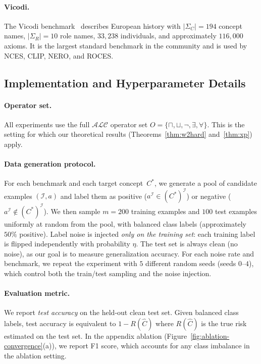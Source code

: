 \documentclass[accepted]{uai2026} %
\theoremstyle{definition}
\theoremstyle{remark}
\begin{document}
\paragraph{Vicodi.}
The Vicodi benchmark~\citep{DBLP:conf/esws/KouagouHDN23}
describes European history with $|\Sigma_C| = 194$ concept
names, $|\Sigma_R| = 10$ role names, $33{,}238$ individuals,
and approximately $116{,}000$ axioms.  It is the largest
standard benchmark in the community and is used by NCES,
CLIP, NERO, and ROCES.

\subsection{Implementation and Hyperparameter
  Details}\label{app:implementation}

\paragraph{Operator set.}
All experiments use the full $\mathcal{ALC}$ operator set
$O = \{\sqcap, \sqcup, \neg, \exists, \forall\}$.
This is the setting for which our theoretical results
(Theorems~\ref{thm:w2hard} and~\ref{thm:xp}) apply.

\paragraph{Data generation protocol.}
For each benchmark and each target concept~$C^*$, we generate
a pool of candidate examples $(\mathcal{I}, a)$ and label
them as positive ($a^{\mathcal{I}} \in (C^*)^{\mathcal{I}}$)
or negative ($a^{\mathcal{I}} \notin (C^*)^{\mathcal{I}}$).
We then sample $m = 200$ training examples and $100$ test
examples uniformly at random from the pool, with balanced
class labels (approximately $50\%$ positive).
Label noise is injected \emph{only on the training set}:
each training label is flipped independently with probability
$\eta$.  The test set is always clean (no noise), as our
goal is to measure generalization accuracy.
For each noise rate and benchmark, we repeat the experiment
with $5$ different random seeds (seeds $0$--$4$), which
control both the train/test sampling and the noise injection.

\paragraph{Evaluation metric.}
We report \emph{test accuracy} on the
held-out clean test set.
Given balanced class labels, test accuracy is equivalent
to $1 - R(\hat{C})$ where $R(\hat{C})$ is the true risk
estimated on the test set.  In the appendix ablation
(Figure~\ref{fig:ablation-convergence}(a)), we report F1
score, which accounts for any class imbalance in
the ablation setting.
\end{document}
